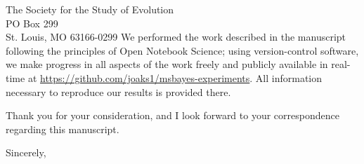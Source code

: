 \documentclass[letterpaper]{letter}
\begin{document}
\begin{letter}{The Society for the Study of Evolution \\
                     PO Box 299 \\
                     St. Louis, MO 63166-0299}
We performed the work described in the manuscript following the principles of
Open Notebook Science; using version-control software, we make progress in all
aspects of the work freely and publicly available in real-time at
\href{https://github.com/joaks1/msbayes-experiments}{\url{https://github.com/joaks1/msbayes-experiments}}.
All information necessary to reproduce our results is provided there.

Thank you for your consideration, and I look forward to your correspondence
regarding this manuscript.

\addtolength{\medskipamount}{-5pt}
\closing{Sincerely,}
\end{letter}
\end{document}
